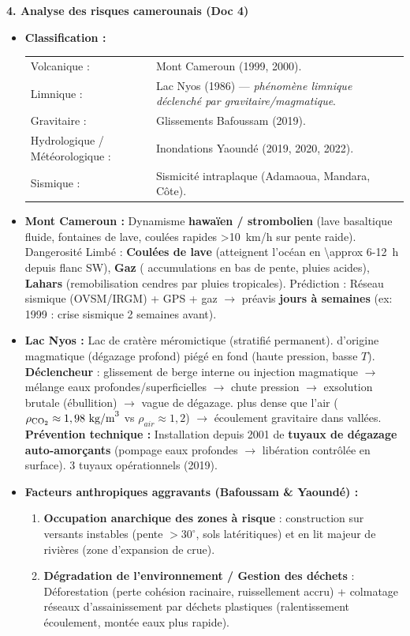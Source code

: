 \documentclass[11pt]{article}
\begin{document}
\begin{exoresolu}
\textbf{4. Analyse des risques camerounais (Doc 4)}
\begin{itemize}
    \item \textbf{Classification :}
    \begin{tabular}{ll}
    Volcanique : & Mont Cameroun (1999, 2000). \\
    Limnique : & Lac Nyos (1986) — \emph{phénomène limnique déclenché par gravitaire/magmatique}. \\
    Gravitaire : & Glissements Bafoussam (2019). \\
    Hydrologique / Météorologique : & Inondations Yaoundé (2019, 2020, 2022). \\
    Sismique : & Sismicité intraplaque (Adamaoua, Mandara, Côte).
    \end{tabular}
    \item \textbf{Mont Cameroun :} Dynamisme \textbf{hawaïen / strombolien} (lave basaltique fluide, fontaines de lave, coulées rapides \SI{>10}{km/h} sur pente raide). Dangerosité Limbé : \textbf{Coulées de lave} (atteignent l'océan en \SI{\approx 6-12}{h} depuis flanc SW), \textbf{Gaz} ( accumulations en bas de pente,  pluies acides), \textbf{Lahars} (remobilisation cendres par pluies tropicales). Prédiction : Réseau sismique (OVSM/IRGM) + GPS + gaz $\rightarrow$ préavis \textbf{jours à semaines} (ex: 1999 : crise sismique 2 semaines avant).
    \item \textbf{Lac Nyos :} Lac de cratère méromictique (stratifié permanent).  d'origine magmatique (dégazage profond) piégé en fond (haute pression, basse $T$). \textbf{Déclencheur} : glissement de berge interne ou injection magmatique $\rightarrow$ mélange eaux profondes/superficielles $\rightarrow$ chute pression $\rightarrow$ exsolution brutale  (ébullition) $\rightarrow$ vague de dégazage.  plus dense que l'air ($\rho_{\ce{CO2}} \approx 1,98 \text{ kg/m}^3$ vs $\rho_{air} \approx 1,2$) $\rightarrow$ écoulement gravitaire dans vallées. \textbf{Prévention technique :} Installation depuis 2001 de \textbf{tuyaux de dégazage auto-amorçants} (pompage eaux profondes $\rightarrow$ libération  contrôlée en surface). 3 tuyaux opérationnels (2019).
    \item \textbf{Facteurs anthropiques aggravants (Bafoussam \& Yaoundé) :}
    \begin{enumerate}
        \item \textbf{Occupation anarchique des zones à risque} : construction sur versants instables (pente $>30^\circ$, sols latéritiques) et en lit majeur de rivières (zone d'expansion de crue).
        \item \textbf{Dégradation de l'environnement / Gestion des déchets} : Déforestation (perte cohésion racinaire, ruissellement accru) + colmatage réseaux d'assainissement par déchets plastiques (ralentissement écoulement, montée eaux plus rapide).
    \end{enumerate}
\end{itemize}


\end{exoresolu}
\end{document}
